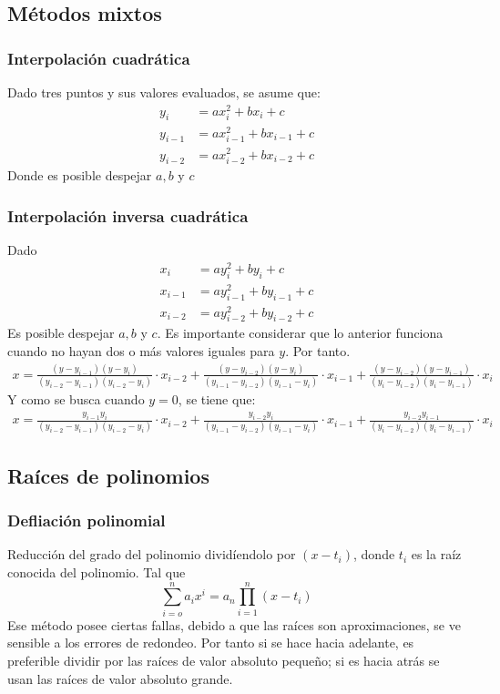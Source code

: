 \documentclass[letterpaper, 12pt, twoside]{article}
\begin{document}
	\subsection{Métodos mixtos}
	\subsubsection{Interpolación cuadrática}
	Dado tres puntos y sus valores evaluados, se asume que:
	\begin{eqnarray*}
		y_i &=ax_i^2+bx_i +c\\
		y_{i-1}&= ax_{i-1}^2+bx_{i-1} +c\\
		y_{i-2}&=ax_{i-2}^2+bx_{i-2} +c
	\end{eqnarray*}
	Donde es posible despejar $a,b$ y $c$
	\subsubsection{Interpolación inversa cuadrática}
	Dado
	\begin{eqnarray*}
		x_i &=ay_i^2+by_i +c\\
		x_{i-1}&= ay_{i-1}^2+by_{i-1} +c\\
		x_{i-2}&=ay_{i-2}^2+by_{i-2} +c
	\end{eqnarray*}
	Es posible despejar $a,b$ y $c$. Es importante considerar que lo anterior funciona cuando no hayan dos o más valores iguales para $y$. Por tanto.
	\begin{eqnarray*}
		x = \frac{(y-y_{i-1})(y-y_i)}{(y_{i-2}-y_{i-1})(y_{i-2}-y_i)}\cdot x_{i-2} + \frac{(y-y_{i-2})(y-y_i)}{(y_{i-1}-y_{i-2})(y_{i-1}-y_i)}\cdot x_{i-1} + \frac{(y-y_{i-2})(y-y_{i-1})}{(y_{i}-y_{i-2})(y_{i}-y_{i-1})}\cdot x_{i}
	\end{eqnarray*}
	Y como se busca cuando $y=0$, se tiene que:
	\begin{eqnarray*}
		x = \frac{y_{i-1}y_i}{(y_{i-2}-y_{i-1})(y_{i-2}-y_i)}\cdot x_{i-2} + \frac{y_{i-2}y_i}{(y_{i-1}-y_{i-2})(y_{i-1}-y_i)}\cdot x_{i-1} + \frac{y_{i-2}y_{i-1}}{(y_{i}-y_{i-2})(y_{i}-y_{i-1})}\cdot x_{i}
	\end{eqnarray*}
	\subsection{Raíces de polinomios}
	\subsubsection{Defliación polinomial}
	Reducción del grado del polinomio dividíendolo por $(x-t_i)$, donde $t_i$ es la raíz conocida del polinomio. Tal que $$\sum_{i=o}^{n}a_ix^i=a_n\prod_{i=1}^{n}(x-t_i)$$
	Ese método posee ciertas fallas, debido a que las raíces son aproximaciones, se ve sensible a los errores de redondeo. Por tanto si se hace hacia adelante, es preferible dividir por las raíces de valor absoluto pequeño; si es hacia atrás se usan las raíces de valor absoluto grande.
	\bigskip
	
\end{document}
